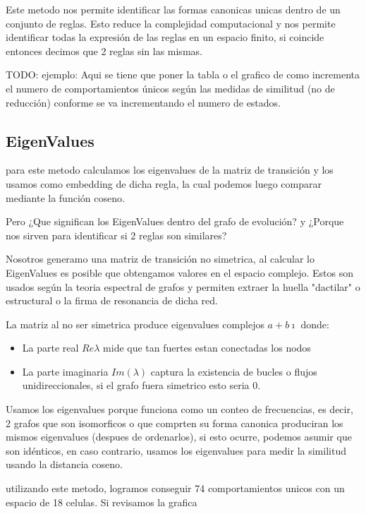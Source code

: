 Este metodo nos permite identificar las formas canonicas unicas dentro de un conjunto de reglas. Esto reduce la complejidad computacional y nos permite identificar todas la expresión de las reglas en un espacio finito, si coincide entonces decimos que 2 reglas sin las mismas. 

TODO: ejemplo: Aqui se tiene que poner la tabla o el grafico de como incrementa el numero de comportamientos únicos según las medidas de similitud (no de reducción) conforme se va incrementando el numero de estados.

\subsection{EigenValues}

para este metodo calculamos los eigenvalues de la matriz de transición y los usamos como embedding de dicha regla, la cual podemos luego comparar mediante la función coseno. 

Pero ¿Que significan los EigenValues dentro del grafo de evolución? y ¿Porque nos sirven para identificar si 2 reglas son similares?

Nosotros generamo una matriz de transición no simetrica, al calcular lo EigenValues es posible que obtengamos valores en el espacio complejo. Estos son usados según la teoria espectral de grafos y permiten extraer la huella "dactilar" o estructural o la firma de resonancia de dicha red.

La matriz al no ser simetrica produce eigenvalues complejos $a + b \imath$ donde:

\begin{itemize}
	\item La parte real $Re{\lambda}$ mide que tan fuertes estan conectadas los nodos
	\item La parte imaginaria $Im(\lambda)$ captura la existencia de bucles o flujos unidireccionales, si el grafo fuera simetrico esto seria 0.
\end{itemize}

Usamos los eigenvalues porque funciona como un conteo de frecuencias, es decir, 2 grafos que son isomorficos o que comprten su forma canonica produciran los mismos eigenvalues (despues de ordenarlos), si esto ocurre, podemos asumir que son idénticos, en caso contrario, usamos los eigenvalues para medir la similitud usando la distancia coseno. 

utilizando este metodo, logramos conseguir 74 comportamientos unicos con un espacio de 18 celulas. Si revisamos la grafica 




